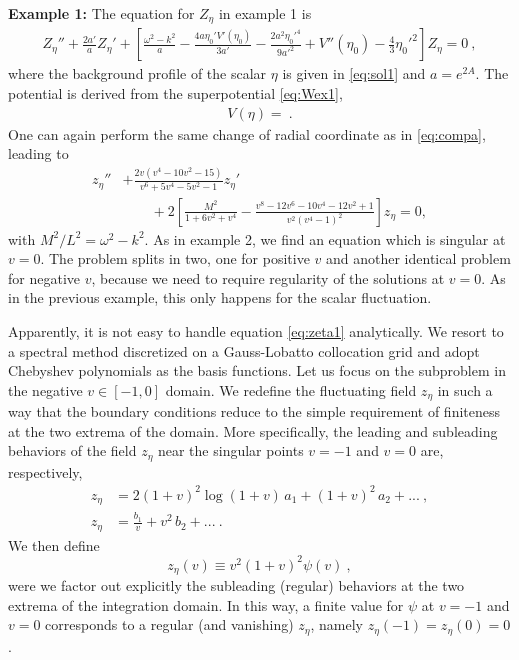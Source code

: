\noindent 
\textbf{Example 1:}
The equation for $Z_\eta$ in example 1 is
\begin{align}
	Z_\eta''
	+
	\frac{2a'}{a} Z_\eta'
	+
	\left[
	\frac{\omega^2-k^2}{a}
	-\frac{4 a \eta_0' V'(\eta_0)}{3a'}
	-\frac{2a^2\eta_0'^4}{9a'^2}
	+V''(\eta_0)
	-\frac{4}{3} \eta_0'^2\right]
	Z_\eta
	=     
	0\ ,
\end{align}
where the background profile of the scalar $\eta$ is given in \eqref{eq:sol1} and $a= e^{2A}$. The potential is derived from the superpotential \eqref{eq:Wex1},
\begin{eqnarray}
	V(\eta)
	=
	\ .
\end{eqnarray}
One can again perform the same change of radial coordinate as in \eqref{eq:compa}, leading to
\begin{align}
	\label{eq:zeta1}
	z_\eta''
	&+
	\frac{2 v \left(v^4-10v^2-15\right) }{v^6+5v^4-5v^2-1}
	z_\eta'
	\\ &\qquad +
	2\left[\frac{M^2}{1+6v^2+v^4}
	-
	\frac{v^8-12v^6-10v^4-12v^2+1}{v^2 \left(v^4-1\right)^2}\right] 
	z_\eta
	=
	0,
\end{align}
with $M^2/L^2 = \omega^2 - k^2$.
As in example 2, we find an equation which is singular at $v=0$. The problem splits in two, one for positive $v$ and another identical problem for negative $v$, because we need to require regularity of the solutions at $v=0$. As in the previous example, this only happens for the scalar fluctuation.

Apparently, it is not easy to handle  equation \eqref{eq:zeta1} analytically. We resort to a spectral method discretized on a Gauss-Lobatto collocation grid and adopt Chebyshev polynomials as the basis functions. Let us focus on the subproblem in the negative $v\in\left[-1,0\right]$ domain. We redefine the fluctuating field $z_\eta$ in such a way that the boundary conditions reduce to the simple requirement of finiteness at the two extrema of the domain. More specifically, the leading and subleading behaviors of the field $z_\eta$ near the singular points $v=-1$ and $v=0$ are, respectively,
\begin{align}
	z_\eta &=
	2(1+v)^2 \log(1+v)\, a_1
	+
	(1+v)^2\, a_2 
	+ ...
	\ , \\
	z_\eta &=
	\frac{b_1}{v}
	+ v^2\, b_2 + ...\ .
\end{align}
We then define 
\begin{equation}
	z_\eta(v) 
	\equiv 
	v^2 (1+v)^2 \psi(v) \ ,
\end{equation}
were we factor out explicitly the subleading (regular) behaviors at the two extrema of the integration domain. In this way, a finite value for $\psi$ at $v=-1$ and $v=0$ corresponds to a regular (and vanishing) $z_\eta$, namely $z_\eta(-1)=z_\eta(0)=0$. 


